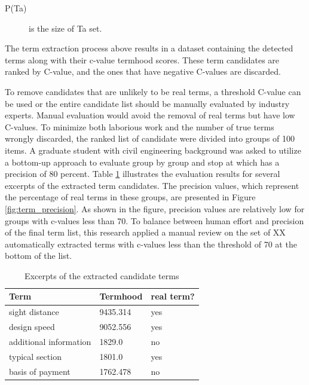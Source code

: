 \documentclass[Journal,InsideFigs, DoubleSpace]{ascelike} %
\begin{document}
{\begin{enumerate} [label=\roman*]
\begin{description}
		\item[P(Ta)] is the size of Ta set.
	\end{description}
\end{enumerate}
%
\par
The term extraction process above results in a dataset containing the detected terms along with their c-value termhood scores. These term candidates are ranked by C-value, and the ones that have negative C-values are discarded. %
\par
To remove candidates that are unlikely to be real terms, a threshold C-value can be used or the entire candidate list should be manually evaluated by industry experts. Manual evaluation would avoid the removal of real terms but have low C-values. To minimize both laborious work and the number of true terms wrongly discarded, the ranked list of candidate were divided into groups of 100 items. A graduate student with civil engineering background was asked to utilize a bottom-up approach to evaluate group by group and stop at which has a precision of 80 percent. Table \ref{table:term_evaluation} illustrates the evaluation results for several excerpts of the extracted term candidates. The precision values, which represent the percentage of real terms in these groups, are presented in Figure \ref{fig:term_precision}. As shown in the figure, precision values are relatively low for groups with c-values less than 70. To balance between human effort and precision of the final term list, this research applied a manual review on the set of XX automatically extracted terms with c-values less than the threshold of 70 at the bottom of the list.
%
\begin{table} [t]
	\caption{Excerpts of the extracted candidate terms}
	\label{table:term_evaluation}
	\centering
	\small
	\renewcommand{\arraystretch}{1.25}
	\begin{tabular}{l l l}
		\hline
		\textbf{Term} & \textbf{Termhood} & \textbf{real term?}\\
		\hline
		sight distance		& 9435.314 & yes\\
		design speed & 9052.556 & yes \\
		additional information & 1829.0 & no\\
		typical section & 1801.0  & yes\\
		basis of payment & 1762.478 & no\\
		\hline
	\end{tabular}
	

\end{table}}
\end{document}
